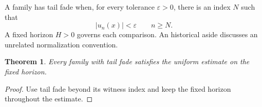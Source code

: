 \documentclass{article}
\newtheorem{theorem}{Theorem}
\begin{document}
A family has tail fade when, for every tolerance $\varepsilon>0$, there is an index $N$ such that
\[
 |u_n(x)|<\varepsilon \qquad n\geq N.
\]
A fixed horizon $H>0$ governs each comparison.
An historical aside discusses an unrelated normalization convention.
\begin{theorem}\label{thm:tail}
Every family with tail fade satisfies the uniform estimate on the fixed horizon.
\end{theorem}
\begin{proof}
Use tail fade beyond its witness index and keep the fixed horizon throughout the estimate.
\end{proof}
\end{document}

